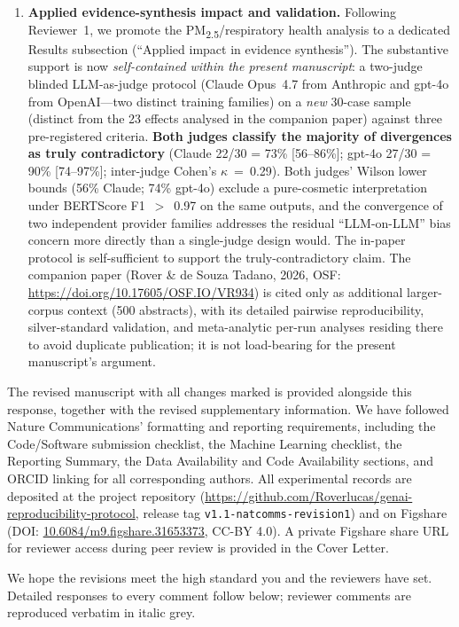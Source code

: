 \documentclass[11pt,a4paper]{article}
\begin{document}
\begin{enumerate}[leftmargin=*]
  \item \textbf{Applied evidence-synthesis impact and validation.} Following Reviewer~1, we promote the PM\textsubscript{2.5}/respiratory health analysis to a dedicated Results subsection (``Applied impact in evidence synthesis''). The substantive support is now \emph{self-contained within the present manuscript}: a two-judge blinded LLM-as-judge protocol (Claude Opus~4.7 from Anthropic and gpt-4o from OpenAI---two distinct training families) on a \emph{new} 30-case sample (distinct from the 23 effects analysed in the companion paper) against three pre-registered criteria. \textbf{Both judges classify the majority of divergences as truly contradictory} (Claude 22/30 = 73\% [56--86\%]; gpt-4o 27/30 = 90\% [74--97\%]; inter-judge Cohen's $\kappa$~=~0.29). Both judges' Wilson lower bounds (56\% Claude; 74\% gpt-4o) exclude a pure-cosmetic interpretation under BERTScore F1~$>$~0.97 on the same outputs, and the convergence of two independent provider families addresses the residual ``LLM-on-LLM'' bias concern more directly than a single-judge design would. The in-paper protocol is self-sufficient to support the truly-contradictory claim. The companion paper (Rover \& de Souza Tadano, 2026, OSF: \url{https://doi.org/10.17605/OSF.IO/VR934}) is cited only as additional larger-corpus context (500 abstracts), with its detailed pairwise reproducibility, silver-standard validation, and meta-analytic per-run analyses residing there to avoid duplicate publication; it is not load-bearing for the present manuscript's argument.
\end{enumerate}

The revised manuscript with all changes marked is provided alongside this response, together with the revised supplementary information. We have followed Nature Communications' formatting and reporting requirements, including the Code/Software submission checklist, the Machine Learning checklist, the Reporting Summary, the Data Availability and Code Availability sections, and ORCID linking for all corresponding authors. All experimental records are deposited at the project repository (\url{https://github.com/Roverlucas/genai-reproducibility-protocol}, release tag \texttt{v1.1-natcomms-revision1}) and on Figshare (DOI: \href{https://doi.org/10.6084/m9.figshare.31653373}{10.6084/m9.figshare.31653373}, CC-BY 4.0). A private Figshare share URL for reviewer access during peer review is provided in the Cover Letter.

We hope the revisions meet the high standard you and the reviewers have set. Detailed responses to every comment follow below; reviewer comments are reproduced verbatim in italic grey.
\end{document}
